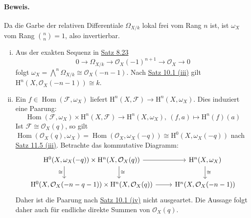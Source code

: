 \paragraph{Beweis.} Da die Garbe der relativen Differentiale $\Omega_{X/k}$ lokal frei vom Rang $n$ ist, ist $\omega_X$ vom Rang $\binom{n}{n}=1$, also invertierbar.
\begin{enumerate}[(i)]
\item Aus der exakten Sequenz in \hyperref[8.23]{Satz 8.23}
\[0\longrightarrow\Omega_{X/k}\longrightarrow\mathcal{O}_X(-1)^{n+1}\longrightarrow\mathcal{O}_X\longrightarrow 0 \]
folgt $\omega_X=\bigwedge^n\Omega_{X/k}\cong\mathcal{O}_X(-n-1)$. Nach \hyperref[10.1]{Satz 10.1 (iii)} gilt $\mathrm{H}^n(X,\mathcal{O}_X(-n-1))\cong k$.
\item Ein $f\in\operatorname{Hom}(\mathcal{F},\omega_X)$ liefert $\mathrm{H}^n(X,\mathcal{F})\to\mathrm{H}^n(X,\omega_X)$. Dies induziert eine Paarung:
\[\operatorname{Hom}(\mathcal{F},\omega_X)\times\mathrm{H}^n(X,\mathcal{F})\to\mathrm{H}^n(X,\omega_X),\ (f,a)\mapsto \mathrm{H}^n(f)(a) \]
Ist $\mathcal{F}\cong\mathcal{O}_X(q)$, so gilt $\operatorname{Hom}(\mathcal{O}_X(q),\omega_X)=\operatorname{Hom}(\mathcal{O}_X,\omega_X(-q))\cong\mathrm{H}^0(X,\omega_X(-q))$ nach \hyperref[11.5]{Satz 11.5 (iii)}. Betrachte das kommutative Diagramm:
\[\begin{tikzcd}
\mathrm{H}^0(X,\omega_X(-q)) \times \mathrm{H}^n(X,\mathcal{O}_X(q)) \rar\ar[d, shift left=4em, "\cong"]\ar[d, shift right=4em, "\cong"']& \mathrm{H}^n(X,\omega_X)\ar[d, "\cong"]\\
\mathrm{H}^0(X,\mathcal{O}_X(-n-q-1))\times\mathrm{H}^n(X,\mathcal{O}_X(q))\rar &\mathrm{H}^n(X,\mathcal{O}_X(-n-1))
\end{tikzcd} \]
Daher ist die Paarung nach \hyperref[10.1]{Satz 10.1 (iv)} nicht ausgeartet. Die Aussage folgt daher auch für endliche direkte Summen von $\mathcal{O}_X(q)$.


\end{enumerate}
